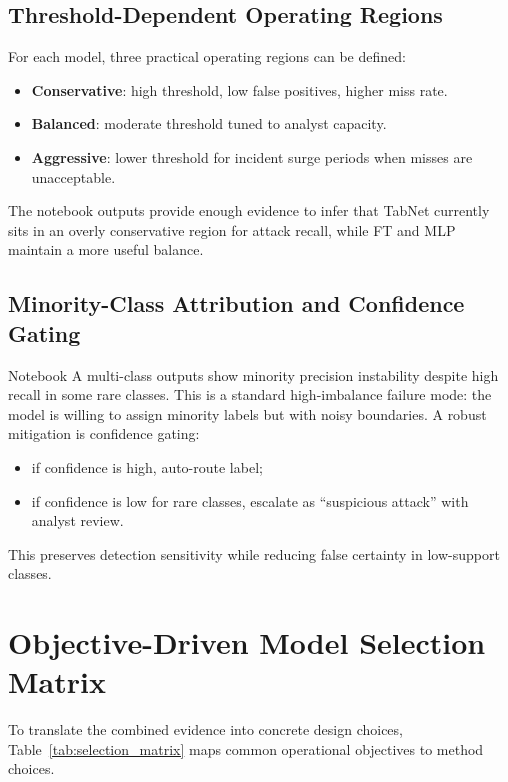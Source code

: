 \documentclass[10pt,journal]{IEEEtran}
\begin{document}
\subsection{Threshold-Dependent Operating Regions}
For each model, three practical operating regions can be defined:
\begin{itemize}
\item \textbf{Conservative}: high threshold, low false positives, higher miss rate.
\item \textbf{Balanced}: moderate threshold tuned to analyst capacity.
\item \textbf{Aggressive}: lower threshold for incident surge periods when misses are unacceptable.
\end{itemize}

The notebook outputs provide enough evidence to infer that TabNet currently sits in an overly conservative region for attack recall, while FT and MLP maintain a more useful balance.

\subsection{Minority-Class Attribution and Confidence Gating}
Notebook A multi-class outputs show minority precision instability despite high recall in some rare classes. This is a standard high-imbalance failure mode: the model is willing to assign minority labels but with noisy boundaries. A robust mitigation is confidence gating:
\begin{itemize}
\item if confidence is high, auto-route label;
\item if confidence is low for rare classes, escalate as ``suspicious attack'' with analyst review.
\end{itemize}

This preserves detection sensitivity while reducing false certainty in low-support classes.

\section{Objective-Driven Model Selection Matrix}
To translate the combined evidence into concrete design choices, Table~\ref{tab:selection_matrix} maps common operational objectives to method choices.
\end{document}
